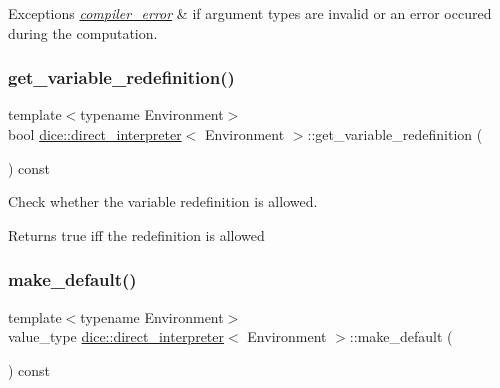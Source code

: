 \begin{DoxyExceptions}{Exceptions}
{\em \mbox{\hyperlink{classdice_1_1compiler__error}{compiler\+\_\+error}}} & if argument types are invalid or an error occured during the computation. \\
\hline
\end{DoxyExceptions}
\mbox{\label{classdice_1_1direct__interpreter_a5df6a2697cba1b1a1668a7d3f056295b}} 
\subsubsection{\texorpdfstring{get\+\_\+variable\+\_\+redefinition()}{get\_variable\_redefinition()}}
{\footnotesize\ttfamily template$<$typename Environment$>$ \\
bool \mbox{\hyperlink{classdice_1_1direct__interpreter}{dice\+::direct\+\_\+interpreter}}$<$ Environment $>$\+::get\+\_\+variable\+\_\+redefinition (\begin{DoxyParamCaption}{ }\end{DoxyParamCaption}) const\hspace{0.3cm}{\ttfamily [inline]}}



Check whether the variable redefinition is allowed. 

\begin{DoxyReturn}{Returns}
true iff the redefinition is allowed 
\end{DoxyReturn}
\mbox{\label{classdice_1_1direct__interpreter_abfb079c8c3c74ea3a572051ef9b91ad5}} 
\subsubsection{\texorpdfstring{make\+\_\+default()}{make\_default()}}
{\footnotesize\ttfamily template$<$typename Environment$>$ \\
value\+\_\+type \mbox{\hyperlink{classdice_1_1direct__interpreter}{dice\+::direct\+\_\+interpreter}}$<$ Environment $>$\+::make\+\_\+default (\begin{DoxyParamCaption}{ }\end{DoxyParamCaption}) const\hspace{0.3cm}{\ttfamily [inline]}}




